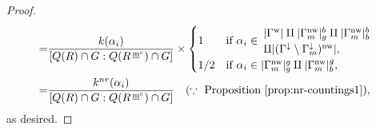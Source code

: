 \documentclass[11pt]{amsart}
\newcommand{\mc}{\, \underline{\mathrm{m}}^c}
\newcommand{\w}{\mathrm{w}}
\newcommand{\nw}{\mathrm{nw}}
\begin{document}
{\begin{proof}
\begin{align*}
=&\dfrac{k(\alpha_i)}{[Q(R)\cap G:Q(R^{\mc})\cap G]}\times
\begin{cases}
1&
\text{if $\alpha_i\in$} \begin{array}{l} |\Gamma^\w|\amalg
|\Gamma_m^\nw|_g^b\amalg |\Gamma_m^\nw|_b^b \\
\amalg |(\Gamma^\downarrow\setminus \Gamma_m^\downarrow)^\nw|,
\end{array}\\[3pt]
1/2 & 
\text{if $\alpha_i\in |\Gamma_m^\nw|_g^g \amalg |\Gamma_m^\nw|_b^g,$}
\end{cases}\\
=&\dfrac{k^{nr}(\alpha_i)}{[Q(R)\cap G:Q(R^{\mc})\cap G]}
\quad (\because\ \text{Proposition \ref{prop:nr-countings1}}),
\end{align*}
as desired. 
\end{proof}
\vskip 3mm

}
\end{document}
